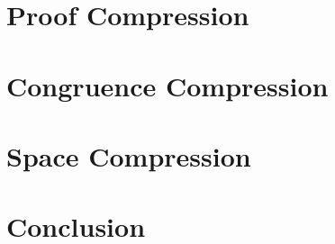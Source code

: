 \documentclass[a4paper,11pt,twoside]{memoir}
\theoremstyle{definition}
\theoremstyle{remark}
\begin{document}


\chapter{Proof Compression}
\label{ch:proofcompression}



\chapter{Congruence Compression}
\label{ch:congruence}



\chapter{Space Compression}
\label{ch:pebbling}



\chapter{Conclusion}
\label{ch:conclusion}




%


\appendix



\end{document}
